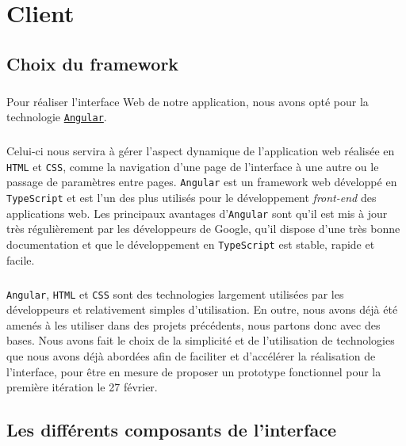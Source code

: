 \chapter{Client}

\section{Choix du framework}

\paragraph{}
Pour réaliser l’interface Web de notre application, nous avons opté pour la technologie \href{https://angular.io/}{\texttt{Angular}}.

\paragraph{}
Celui-ci nous servira à gérer l’aspect dynamique de l’application web réalisée en \texttt{HTML} et \texttt{CSS}, comme la navigation d’une page de l’interface à une autre ou le passage de paramètres entre pages. \texttt{Angular} est un framework web développé en \texttt{TypeScript} et est l’un des plus utilisés pour le développement \textit{front-end} des applications web. Les principaux avantages d’\texttt{Angular} sont qu’il est mis à jour très régulièrement par les développeurs de Google, qu’il dispose d’une très bonne documentation et que le développement en \texttt{TypeScript} est stable, rapide et facile.

\paragraph{}
\texttt{Angular}, \texttt{HTML} et \texttt{CSS} sont des technologies largement utilisées par les développeurs et relativement simples d’utilisation. En outre, nous avons déjà été amenés à les utiliser dans des projets précédents, nous partons donc avec des bases. Nous avons fait le choix de la simplicité et de l’utilisation de technologies que nous avons déjà abordées afin de faciliter et d’accélérer la réalisation de l’interface, pour être en mesure de proposer un prototype fonctionnel pour la première itération le 27 février.

\section{Les différents composants de l'interface}

